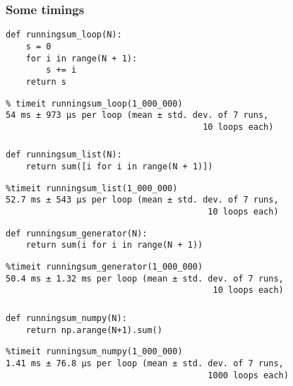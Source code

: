 \documentclass[serif]{beamer}
\begin{document}
\begin{frame}[fragile,t]
  \frametitle{Some timings}

  \begin{verbatim}
def runningsum_loop(N):
    s = 0
    for i in range(N + 1):
        s += i
    return s
  \end{verbatim}
  \begin{verbatim}
% timeit runningsum_loop(1_000_000)
54 ms ± 973 µs per loop (mean ± std. dev. of 7 runs,
                                       10 loops each)
  \end{verbatim}
\end{frame}

\begin{frame}[fragile,t]
  \frametitle{\phantom{S}}
  \begin{verbatim}
def runningsum_list(N):
    return sum([i for i in range(N + 1)])
  \end{verbatim}
  \begin{verbatim}
%timeit runningsum_list(1_000_000)
52.7 ms ± 543 µs per loop (mean ± std. dev. of 7 runs,
                                        10 loops each)
  \end{verbatim}

  \pause

  \begin{verbatim}
def runningsum_generator(N):
    return sum(i for i in range(N + 1))
  \end{verbatim}
  \begin{verbatim}
%timeit runningsum_generator(1_000_000)
50.4 ms ± 1.32 ms per loop (mean ± std. dev. of 7 runs,
                                         10 loops each)
  \end{verbatim}
\end{frame}

\begin{frame}[fragile,t]
  \frametitle{\phantom{S}}
  \begin{verbatim}
def runningsum_numpy(N):
    return np.arange(N+1).sum()
  \end{verbatim}
  \begin{verbatim}
%timeit runningsum_numpy(1_000_000)
1.41 ms ± 76.8 µs per loop (mean ± std. dev. of 7 runs,
                                        1000 loops each)
  \end{verbatim}
\end{frame}
\end{document}
